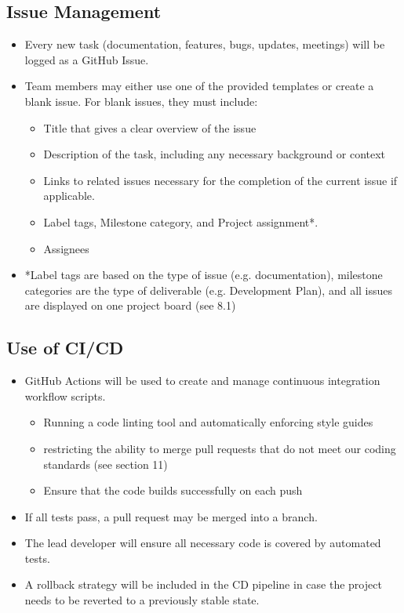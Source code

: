 \documentclass{article}
\begin{document}
\subsection{Issue Management}
\begin{itemize}
	\item Every new task (documentation, features, bugs, updates, meetings) will be logged as a GitHub Issue.
	\item Team members may either use one of the provided templates or create a blank issue. For blank issues, 
  they must include:
	\begin{itemize}
    \item Title that gives a clear overview of the issue
    \item Description of the task, including any necessary background or context
    \item Links to related issues necessary for the completion of the current issue if applicable.
    \item Label tags, Milestone category, and Project assignment*.
    \item Assignees
  \end{itemize}
  \item *Label tags are based on the type of issue (e.g. documentation), milestone categories 
  are the type of deliverable (e.g. Development Plan), and all issues are displayed on one project board (see 8.1)
\end{itemize}

\subsection{Use of CI/CD}
\begin{itemize}
	\item GitHub Actions will be used to create and manage continuous integration workflow scripts.
	\begin{itemize}
    \item Running a code linting tool and automatically enforcing style guides
    \item restricting the ability to merge pull requests that do not meet our coding standards (see section 11)
    \item Ensure that the code builds successfully on each push
  \end{itemize}
	\item If all tests pass, a pull request may be merged into a branch.
	\item The lead developer will ensure all necessary code is covered by automated tests.
	\item A rollback strategy will be included in the CD pipeline in case the project needs 
  to be reverted to a previously stable state.
\end{itemize}
\end{document}
